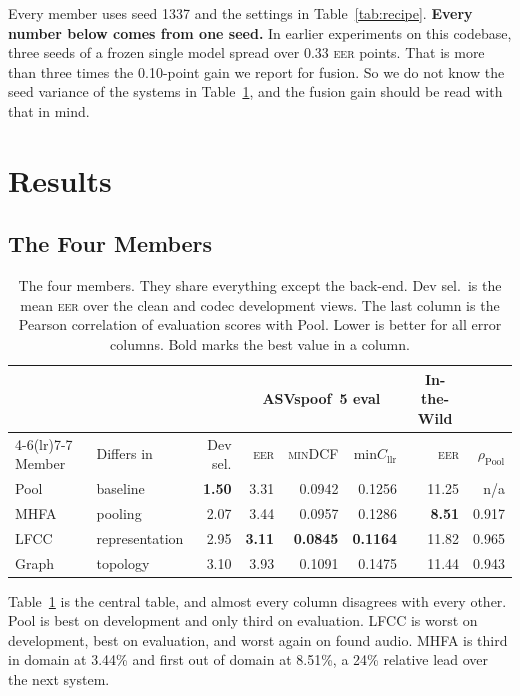 \documentclass[twocolumn,a4paper,11pt]{article}
\newcommand{\eer}{\textsc{eer}}
\newcommand{\mindcf}{\textsc{minDCF}}
\newcommand{\best}[1]{\textbf{#1}}
\begin{document}
Every member uses seed 1337 and the settings in Table~\ref{tab:recipe}.
\textbf{Every number below comes from one seed.} In earlier experiments on this
codebase, three seeds of a frozen single model spread over 0.33 \eer{} points.
That is more than three times the 0.10-point gain we report for fusion. So we
do not know the seed variance of the systems in Table~\ref{tab:members}, and
the fusion gain should be read with that in mind.

\section{Results}
\label{sec:results}

\subsection{The Four Members}

\begin{table}[t]
\centering
\caption{The four members. They share everything except the back-end. Dev sel.\
is the mean \eer{} over the clean and codec development views. The last column
is the Pearson correlation of evaluation scores with Pool. Lower is better for
all error columns. Bold marks the best value in a column.}
\label{tab:members}
\small
\begin{tabular}{llrrrrrr}
\toprule
& & & \multicolumn{3}{c}{ASVspoof~5 eval} &
  \multicolumn{1}{c}{In-the-Wild} & \\
\cmidrule(lr){4-6}\cmidrule(lr){7-7}
Member & Differs in & Dev sel. &
  \eer{} & \mindcf{} & min$C_\text{llr}$ & \eer{} & $\rho_{\text{Pool}}$ \\
\midrule
Pool  & baseline        & \best{1.50} & 3.31 & 0.0942 & 0.1256 & 11.25 & n/a \\
MHFA  & pooling         & 2.07 & 3.44 & 0.0957 & 0.1286 & \best{8.51} & 0.917 \\
LFCC  & representation  & 2.95 & \best{3.11} & \best{0.0845} & \best{0.1164} & 11.82 & 0.965 \\
Graph & topology        & 3.10 & 3.93 & 0.1091 & 0.1475 & 11.44 & 0.943 \\
\bottomrule
\end{tabular}
\end{table}

Table~\ref{tab:members} is the central table, and almost every column
disagrees with every other. Pool is best on development and only third on
evaluation. LFCC is worst on development, best on evaluation, and worst again
on found audio. MHFA is third in domain at 3.44\% and first out of domain at
8.51\%, a 24\% relative lead over the next system.
\end{document}
